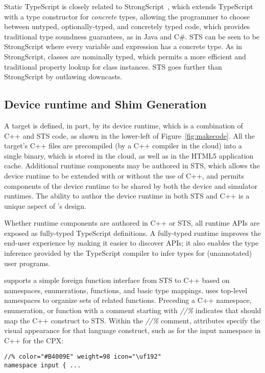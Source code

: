 Static TypeScript is closely related to  StrongScript~\cite{StrongScriptECOOP15}, which extends TypeScript with a type constructor for \emph{concrete} types, allowing the programmer to choose between untyped, optionally-typed, and concretely typed code, which provides traditional type soundness guarantees, as in Java and C\#. STS can be seen to be StrongScript where every variable and expression has a concrete type. As in StrongScript, classes are nominally typed, which permits a more efficient and traditional property lookup for class instances. STS goes further than StrongScript by outlawing downcasts.

\subsection{Device runtime and Shim Generation}
\label{sec:shim-gen}
A \MC target is defined, in part, by its device runtime, which is a combination of C++ and STS code, as shown in the lower-left of Figure~\ref{fig:makecode}. All the target's C++ files are precompiled (by a C++ compiler in the cloud) into a single binary, which is stored in the cloud, as well as in the HTML5 application cache. Additional runtime components may be authored in STS, which allows the device runtime to be extended with or without the use of C++, and permits components of the device runtime to be shared by both the device and simulator runtimes. The ability to author the device runtime in both STS and C++ is a unique aspect of \MCN's design.

Whether runtime components are authored in C++ or STS, all runtime APIs are exposed as fully-typed TypeScript definitions. A fully-typed runtime improves the end-user experience by making it easier to discover APIs; it also enables the type inference provided by the TypeScript compiler to infer types for (unannotated) user programs.

\MC supports a simple foreign function interface from STS to C++ based on namespaces, enumerations, functions, and basic type mappings. \MC uses top-level namespaces to organize sets of related functions. Preceding a C++ namespace, enumeration, or function
with a comment starting with \emph{//\%} indicates that \MC should map the C++ construct to STS. Within the \emph{//\%} comment, attributes specify the visual appearance for that
language construct, such as for the input namespace in C++ for the CPX:

\begin{lstlisting}
//% color="#B4009E" weight=98 icon="\uf192"
namespace input { ...
\end{lstlisting}

